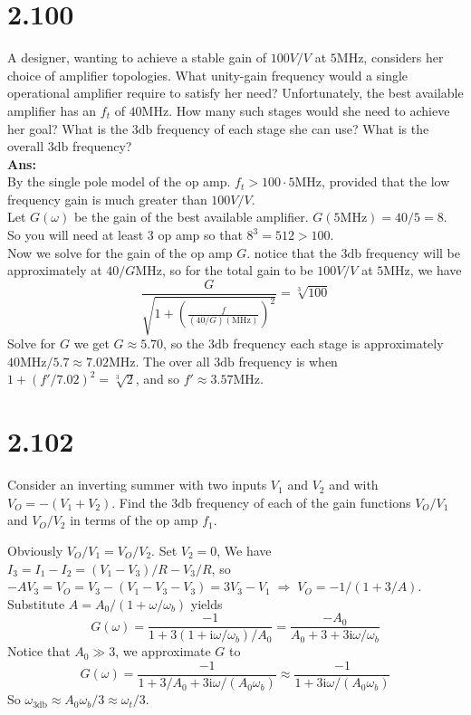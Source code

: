 \documentclass[12pt, a4paper]{article}
\newcommand{\sdb}{\si{\decibel}}
\newcommand{\img}{\mathrm{i}}
\newcommand{\Ans}{{\\ \bf Ans:} \\}
\begin{document}
\section{2.100}
A designer, wanting to achieve a stable gain of $100 \si{V/V}$ at $5 \si{\mega\hertz}$, considers her choice of amplifier topologies. What unity-gain frequency would a single operational amplifier require to satisfy her need? Unfortunately, the best available amplifier has an $f_t$ of $40 \si{\mega\hertz}$. How many such stages would she need to achieve her goal? What is the $3\sdb$ frequency of each stage she can use? What is the overall $3\sdb$ frequency?
\Ans
By the single pole model of the op amp. $f_t > 100 \cdot 5 \si{\mega\hertz}$, provided that the low frequency gain is much greater than $100 \si{V/V}$.\\ 
Let $G(\omega)$ be the gain of the best available amplifier. $G(5\si{\mega\hertz}) = 40 / 5 = 8$. So you will need at least $3$ op amp so that $8^3 = 512 > 100$.\\
Now we solve for the gain of the op amp $G$. notice that the $3\sdb$ frequency will be approximately at $40/G \si{\mega\hertz}$, so for the total gain to be $100 \si{V/V}$ at $5 \si{\mega\hertz}$, we have
\[
  \frac{G}{\displaystyle \sqrt{1 + \left(\frac{f}{(40 / G) (\si{\mega\hertz})}\right)^2}} = \sqrt[3]{100}
\]
Solve for $G$ we get $G \approx 5.70$, so the $3 \sdb$ frequency each stage is approximately $40\si{\mega\hertz} / 5.7 \approx 7.02\si{\mega\hertz}$. The over all $3 \sdb$ frequency is when $1 + (f'/7.02)^2 = \sqrt[3]{2}$, and so $f' \approx 3.57 \si{\mega\hertz}$.
\section{2.102}
Consider an inverting summer with two inputs $V_1$ and $V_2$ and with $V_O = -(V_1 + V_2)$. Find the $3 \sdb$ frequency of each of the gain functions $V_O / V_1$ and $V_O / V_2$ in terms of the op amp $f_1$.

Obviously $V_O / V_1 = V_O / V_2$.
Set $V_2 = 0$, We have $I_3 = I_1 - I_2 = (V_1 - V_3) / R - V_3 / R$, so $-AV_3 = V_O = V_3 - (V_1 - V_3 - V_3) = 3V_3 - V_1 \; \Rightarrow \; V_O = -1 / (1 + 3 / A)$. Substitute $A = A_0 / (1 + \omega / \omega_b)$ yields 
\[
  G(\omega) = \frac{-1}{1 + 3(1 + \img \omega / \omega_b) / A_0} = \frac{-A_0}{A_0 + 3 + 3 \img \omega / \omega_b}
\]
Notice that $A_0 \gg 3$, we approximate $G$ to \\
\[
  G(\omega) =  \frac{-1}{1 + 3/A_0 + 3 \img \omega / (A_0 \omega_b)}
  \approx  \frac{-1}{1 + 3 \img \omega / (A_0 \omega_b)}
\]
 So $\omega_{3\sdb} \approx A_0 \omega_b / 3 \approx \omega_t / 3 $.
\end{document}
